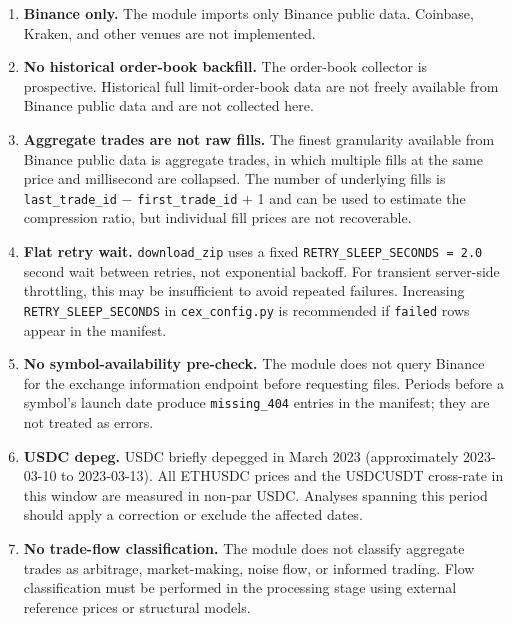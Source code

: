 \documentclass[11pt,a4paper]{article}
\begin{document}
\begin{enumerate}
  \item \textbf{Binance only.}
        The module imports only Binance public data. Coinbase,
        Kraken, and other venues are not implemented.

  \item \textbf{No historical order-book backfill.}
        The order-book collector is prospective. Historical full
        limit-order-book data are not freely available from Binance
        public data and are not collected here.

  \item \textbf{Aggregate trades are not raw fills.}
        The finest granularity available from Binance public data
        is aggregate trades, in which multiple fills at the same
        price and millisecond are collapsed. The number of underlying
        fills is \texttt{last\_trade\_id} $-$ \texttt{first\_trade\_id}
        $+$ 1 and can be used to estimate the compression ratio, but
        individual fill prices are not recoverable.

  \item \textbf{Flat retry wait.}
        \texttt{download\_zip} uses a fixed \texttt{RETRY\_SLEEP\_SECONDS
        = 2.0} second wait between retries, not exponential backoff.
        For transient server-side throttling, this may be insufficient
        to avoid repeated failures. Increasing \texttt{RETRY\_SLEEP\_SECONDS}
        in \texttt{cex\_config.py} is recommended if \texttt{failed}
        rows appear in the manifest.

  \item \textbf{No symbol-availability pre-check.}
        The module does not query Binance for the exchange information
        endpoint before requesting files. Periods before a symbol's
        launch date produce \texttt{missing\_404} entries in the
        manifest; they are not treated as errors.

  \item \textbf{USDC depeg.}
        USDC briefly depegged in March 2023 (approximately
        2023-03-10 to 2023-03-13). All ETHUSDC prices and the
        USDCUSDT cross-rate in this window are measured in non-par
        USDC. Analyses spanning this period should apply a correction
        or exclude the affected dates.

  \item \textbf{No trade-flow classification.}
        The module does not classify aggregate trades as arbitrage,
        market-making, noise flow, or informed trading. Flow
        classification must be performed in the processing stage
        using external reference prices or structural models.


\end{enumerate}
\end{document}
